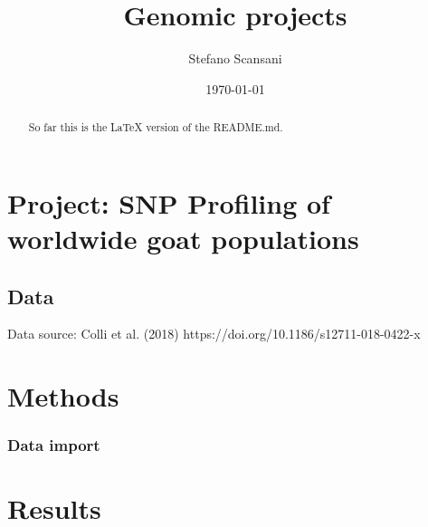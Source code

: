 \documentclass[a4paper,onecolumn,10pt]{article}
\begin{document}
\title{Genomic projects}
\author{Stefano Scansani}
\date{\today}
\maketitle
\begin{abstract}

    So far this is the \LaTeX{} version of the README.md.

\end{abstract}
\tableofcontents
\listoffigures
\listoftables

%


\section{Project: SNP Profiling of worldwide goat populations}

\subsection{Data}

Data source: Colli et al. (2018)
https://doi.org/10.1186/s12711-018-0422-x

\section{Methods}

\subsubsection{Data import}

\section{Results}




\end{document}
